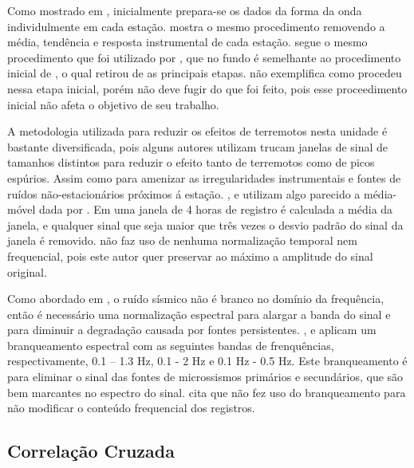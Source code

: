 \documentclass[paper,twocolumn]{geophysics}
\begin{document}
Como mostrado em \cite{bensen_processing_2007}, inicialmente prepara-se os dados da forma da onda individulmente em cada estação. \cite{roux_p-waves_2005} mostra o mesmo procedimento removendo a média, tendência e resposta instrumental de cada estação. \cite{boue_teleseismic_2013} segue o mesmo procedimento que foi utilizado por \cite{poli_body-wave_2012}, que no fundo é semelhante ao procedimento inicial de \cite{poli_emergence_2012}, o qual retirou de \cite{bensen_processing_2007} as principais etapas. \cite{prieto_amplitude_2011} não exemplifica como procedeu nessa etapa inicial, porém não deve fugir do que foi feito, pois esse proceedimento inicial não afeta o objetivo de seu trabalho.

A metodologia utilizada para reduzir os efeitos de terremotos nesta unidade é bastante diversificada, pois alguns autores utilizam trucam janelas de sinal de tamanhos distintos para reduzir o efeito tanto de terremotos como de picos espúrios. Assim como para amenizar as irregularidades instrumentais e fontes de ruídos não-estacionários próximos á estação. \cite{roux_p-waves_2005}, \cite{poli_emergence_2012} e \citep{boue_teleseismic_2013} utilizam algo parecido a média-móvel dada por \cite{bensen_processing_2007}. Em uma janela de 4 horas de registro é calculada a média da janela, e qualquer sinal que seja maior que três vezes o desvio padrão do sinal da janela é removido. \cite{prieto_amplitude_2011} não faz uso de nenhuma normalização temporal nem frequencial, pois este autor quer preservar ao máximo a amplitude do sinal original.

Como abordado em \cite{bensen_processing_2007}, o ruído sísmico não é branco no domínio da frequência, então é necessário uma normalização espectral para alargar a banda do sinal e para diminuir a degradação causada por fontes persistentes. \cite{roux_p-waves_2005}, \cite{poli_emergence_2012} e \citep{boue_teleseismic_2013} aplicam um branqueamento espectral com as seguintes bandas de frenquências, respectivamente, 0.1 – 1.3 Hz, 0.1 - 2 Hz e 0.1 Hz - 0.5 Hz. Este branqueamento é para eliminar o sinal das fontes de microssismos primários e secundários, que são bem marcantes no espectro do sinal. \cite{larose_fluctuations_2008} cita que não fez uso do branqueamento para não modificar o conteúdo frequencial dos registros. 


\subsection*{Correlação Cruzada}
\end{document}
